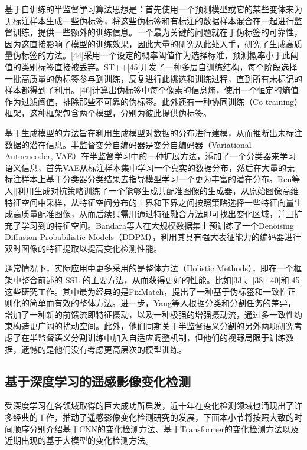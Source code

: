 \documentclass[lang=chs, degree=master, blindreview=false, adobe=false]{yanputhesis}
\begin{document}
基于自训练的半监督学习算法思想是：首先使用一个预测模型或它的某些变体来为无标注样本生成一些伪标签，将这些伪标签和有标注的数据样本混合在一起进行监督训练，提供一些额外的训练信息。一个最为关键的问题就在于伪标签的可靠性，因为这直接影响了模型的训练效果，因此大量的研究从此处入手，研究了生成高质量伪标签的方法。[44]采用一个设定的概率阈值作为选择标准，预测概率小于此阈值的类别标签直接被丢弃。ST++[45]开发了一种多层自训练结构，每个阶段选择一批高质量的伪标签参与到训练，反复进行此挑选和训练过程，直到所有未标记的样本都得到了利用。[46]计算出伪标签中每个像素的信息熵，使用一个恒定的熵值作为过滤阈值，排除那些不可靠的伪标签。此外还有一种协同训练（Co-training）框架\cite{co-training}，这种框架包含两个模型，分别为彼此提供伪标签。

基于生成模型的方法旨在利用生成模型对数据的分布进行建模，从而推断出未标注数据的潜在信息。半监督变分自编码器\cite{semiVAE}是变分自编码器（Variational Autoencoder, VAE）在半监督学习中的一种扩展方法，添加了一个分类器来学习语义信息，首先VAE从标注样本集中学习一个真实的数据分布，然后在大量的无标注样本上基于分类器分类结果去指导模型学习一个更为丰富的潜在分布。Ren等人[]利用生成对抗策略训练了一个能够生成共配准图像的生成器，从原始图像高维特征空间中采样，从特征空间分布的上界和下界之间按照策略选择一些特征向量生成高质量配准图像，从而后续只需用通过特征融合方法即可找出变化区域，并且扩充了学习到的特征空间。Bandara等人在大规模数据集上预训练了一个Denoising
Diffusion Probabilistic Models（DDPM），利用其具有强大表征能力的编码器进行双时图像的特征提取以提高变化检测性能。

通常情况下，实际应用中更多采用的是整体方法（Holistic Methods），即在一个框架中整合前述的 SSL 的主要方法，从而获得更好的性能。比如[33]、[38]-[40]和[45]这些研究工作。其中最为经典的是FixMatch\cite{sohn2020fixmatch}，提出了一种基于伪标签和一致性正则化的简单而有效的整体方法。进一步，Yang等人根据分类和分割任务的差异，增加了一种新的前馈流即特征摄动，以及一种极强的增强摄动流，通过多一致性约束构造更广阔的扰动空间。此外，他们同期关于半监督语义分割的另外两项研究考虑了在半监督语义分割训练中加入自适应调整机制，但他们的视野局限于训练数据，遗憾的是他们没有考虑更高层次的模型训练。

\subsection{基于深度学习的遥感影像变化检测}
受深度学习在各领域取得的巨大成功所启发，近十年在变化检测领域也涌现出了许多经典的工作，推动了遥感影像变化检测研究的发展，下面本小节将按照大致的时间顺序分别介绍基于CNN的变化检测方法、基于Transformer的变化检测方法以及近期出现的基于大模型的变化检测方法。
\end{document}

